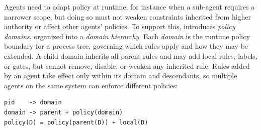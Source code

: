 Agents need to adapt policy at runtime, for instance when a sub-agent requires a narrower scope, but doing so must not weaken constraints inherited from higher authority or affect other agents' policies.
To support this, \sys{} introduces \emph{policy domains}, organized into a \emph{domain hierarchy}.
Each \emph{domain} is the runtime policy boundary for a process tree, governing which rules apply and how they may be extended.
A child domain inherits all parent rules and may add local rules, labels, or gates, but cannot remove, disable, or weaken any inherited rule.
Rules added by an agent take effect only within its domain and descendants, so multiple agents on the same system can enforce different policies:

\begin{small}
\begin{verbatim}
pid    -> domain
domain -> parent + policy(domain)
policy(D) = policy(parent(D)) + local(D)
\end{verbatim}
\end{small}

